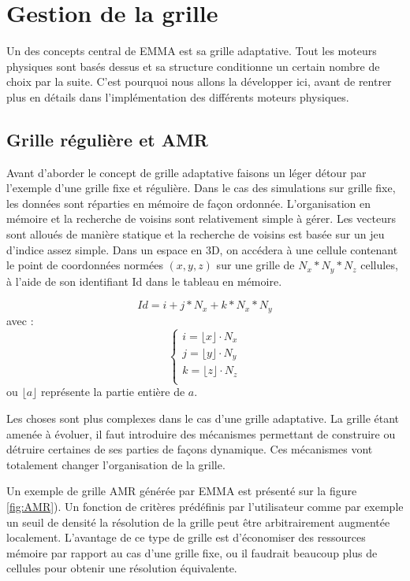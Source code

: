 \section{Gestion de la grille}
\label{sec_gestion_grille}

Un des concepts central de EMMA est sa grille adaptative.
Tout les moteurs physiques sont basés dessus et sa structure conditionne un certain nombre de choix par la suite.
C'est pourquoi nous allons la développer ici, avant de rentrer plus en détails dans l'implémentation des différents moteurs physiques.

\subsection{Grille régulière et AMR}
Avant d'aborder le concept de grille adaptative faisons un léger détour par l'exemple d'une grille fixe et régulière.
Dans le cas des simulations sur grille fixe, les données sont réparties en mémoire de façon ordonnée.
L'organisation en mémoire et la recherche de voisins sont relativement simple à gérer.
Les vecteurs sont alloués de manière statique et la recherche de voisins est basée sur un jeu d'indice assez simple.
Dans un espace en 3D, on accédera à une cellule contenant le point de coordonnées normées $(x,y,z)$ sur une grille de $N_x*N_y*N_z$ cellules, à l'aide de son identifiant Id dans le tableau en mémoire.

\begin{equation}
Id = i + j*N_x + k * N_x*N_y
\end{equation}
avec :
\begin{equation}
\begin{cases}
i=\lfloor x \rfloor \cdot N_x \\
j=\lfloor y \rfloor \cdot N_y \\
k=\lfloor z \rfloor \cdot N_z \\
\end{cases}
\end{equation}
ou $\lfloor a \rfloor$ représente la partie entière de $a$.

Les choses sont plus complexes dans le cas d'une grille adaptative.
La grille étant amenée à évoluer, il faut introduire des mécanismes permettant de construire ou détruire certaines de ses parties de façons dynamique.
Ces mécanismes vont totalement changer l'organisation de la grille.

Un exemple de grille \ac{AMR} générée par EMMA est présenté sur la figure \ref{fig:AMR}).
Un fonction de critères prédéfinis par l'utilisateur comme par exemple un seuil de densité la résolution de la grille peut être arbitrairement augmentée localement.
L'avantage de ce type de grille est d'économiser des ressources mémoire par rapport au cas d'une grille fixe, ou il faudrait beaucoup plus de cellules pour obtenir une résolution équivalente.

